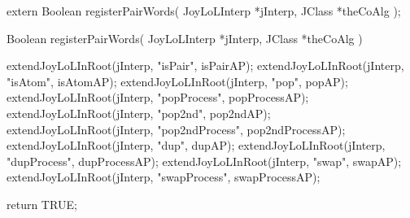 \startCHeader
extern Boolean registerPairWords(
  JoyLoLInterp *jInterp,
  JClass       *theCoAlg
);
\stopCHeader
{}

\startCCode
Boolean registerPairWords(
  JoyLoLInterp *jInterp,
  JClass       *theCoAlg
) {
  extendJoyLoLInRoot(jInterp, "isPair",        isPairAP);
  extendJoyLoLInRoot(jInterp, "isAtom",        isAtomAP);
  extendJoyLoLInRoot(jInterp, "pop",           popAP);
  extendJoyLoLInRoot(jInterp, "popProcess",    popProcessAP);
  extendJoyLoLInRoot(jInterp, "pop2nd",        pop2ndAP);
  extendJoyLoLInRoot(jInterp, "pop2ndProcess", pop2ndProcessAP);
  extendJoyLoLInRoot(jInterp, "dup",           dupAP);
  extendJoyLoLInRoot(jInterp, "dupProcess",    dupProcessAP);
  extendJoyLoLInRoot(jInterp, "swap",          swapAP);
  extendJoyLoLInRoot(jInterp, "swapProcess",   swapProcessAP);
  
  return TRUE;
}
\stopCCode

\stopTestSuite
